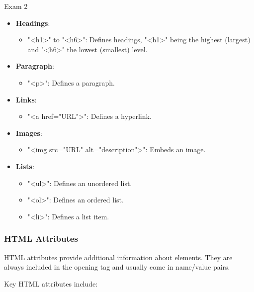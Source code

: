 \begin{examnotes}{Exam 2}
\begin{highlight}
        \begin{itemize}
            \item \textbf{Headings}:
                \begin{itemize}
                    \item "<h1>" to "<h6>": Defines headings, "<h1>" being the highest (largest) and "<h6>" the lowest (smallest) level.
                \end{itemize}
            \item \textbf{Paragraph}:
                \begin{itemize}
                    \item "<p>": Defines a paragraph.
                \end{itemize}
            \item \textbf{Links}:
                \begin{itemize}
                    \item "<a href="URL">": Defines a hyperlink.
                \end{itemize}
            \item \textbf{Images}:
                \begin{itemize}
                    \item "<img src="URL" alt="description">": Embeds an image.
                \end{itemize}
            \item \textbf{Lists}:
                \begin{itemize}
                    \item "<ul>": Defines an unordered list.
                    \item "<ol>": Defines an ordered list.
                    \item "<li>": Defines a list item.
                \end{itemize}
        \end{itemize}
    \end{highlight}
    
    \subsubsection*{HTML Attributes}
    
    HTML attributes provide additional information about elements. They are always included in the opening tag and usually come in name/value pairs.
    
    \begin{highlight}
        Key HTML attributes include:
        

\end{highlight}
\end{examnotes}
